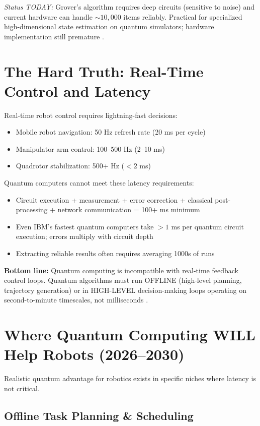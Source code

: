 \documentclass[conference]{IEEEtran}
\begin{document}
\textit{Status TODAY:} Grover's algorithm requires deep circuits (sensitive to noise) and current hardware can handle $\sim10,000$ items reliably. Practical for specialized high-dimensional state estimation on quantum simulators; hardware implementation still premature \cite{b30, b31, b32, b33}.

\section{The Hard Truth: Real-Time Control and Latency}

Real-time robot control requires lightning-fast decisions:
\begin{itemize}
\item Mobile robot navigation: 50 Hz refresh rate (20 ms per cycle) \cite{b34, b35, b36}
\item Manipulator arm control: 100--500 Hz (2--10 ms)
\item Quadrotor stabilization: 500+ Hz ($<2$ ms)
\end{itemize}

Quantum computers cannot meet these latency requirements:
\begin{itemize}
\item Circuit execution + measurement + error correction + classical post-processing + network communication = 100+ ms minimum \cite{b9, b10}
\item Even IBM's fastest quantum computers take $>1$ ms per quantum circuit execution; errors multiply with circuit depth \cite{b13, b14}
\item Extracting reliable results often requires averaging 1000s of runs
\end{itemize}

\textbf{Bottom line:} Quantum computing is incompatible with real-time feedback control loops. Quantum algorithms must run OFFLINE (high-level planning, trajectory generation) or in HIGH-LEVEL decision-making loops operating on second-to-minute timescales, not milliseconds \cite{b9, b35}.

\section{Where Quantum Computing WILL Help Robots (2026--2030)}

Realistic quantum advantage for robotics exists in specific niches where latency is not critical.

\subsection{Offline Task Planning \& Scheduling}
\end{document}
